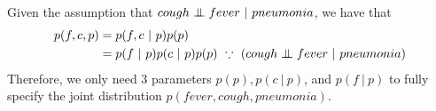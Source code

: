 \newcommand{\CI}{\mathrel{\perp\mkern-10mu\perp}}
\newcommand{\given}{~\vert~}

Given the assumption that $cough \CI fever \given pneumonia$, we have that
\begin{align*}
    p(f,c,p) &= p(f,c \given p) p(p)\\
             &= p(f \given p) p(c \given p) p(p) ~\because ~(cough \CI fever \given pneumonia)
\end{align*}
Therefore, we only need 3 parameters $p(p), p(c \given p)$, and $p(f\given p)$ to fully specify the joint distribution $p(fever,cough,pneumonia)$.